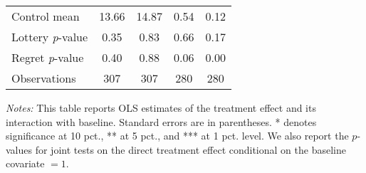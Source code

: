 \begin{table}[ht]
{\begin{threeparttable}
\begin{tabular}{l*{4}{c}}
Control mean    &    13.66         &    14.87         &     0.54         &     0.12         \\
Lottery \emph{p}-value&     0.35         &     0.83         &     0.66         &     0.17         \\
Regret \emph{p}-value&     0.40         &     0.88         &     0.06         &     0.00         \\
Observations    &      307         &      307         &      280         &      280         \\
\bottomrule \end{tabular} \begin{tablenotes}[flushleft] \footnotesize \item \emph{Notes:} This table reports OLS estimates of the treatment effect and its interaction with baseline. Standard errors are in parentheses. * denotes significance at 10 pct., ** at 5 pct., and *** at 1 pct. level. We also report the \(p\)-values for joint tests on the direct treatment effect conditional on the baseline covariate $= 1$. \end{tablenotes} \end{threeparttable} } \end{table}

